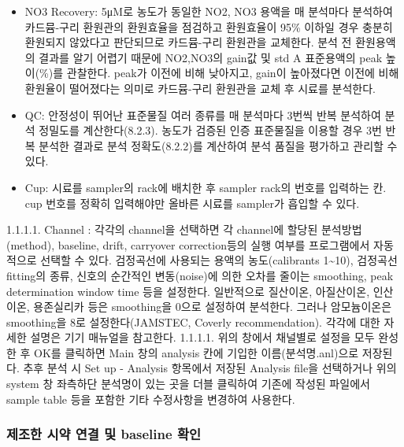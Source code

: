 \documentclass[
]{book}
\begin{document}
\begin{itemize}
\item
  NO3 Recovery: 5μM로 농도가 동일한 NO2, NO3 용액을 매 분석마다 분석하여 카드뮴-구리 환원관의 환원효율을 점검하고 환원효율이 95\% 이하일 경우 충분히 환원되지 않았다고 판단되므로 카드뮴-구리 환원관을 교체한다.
  분석 전 환원용액의 결과를 알기 어렵기 때문에 NO2,NO3의 gain값 및 std A 표준용액의 peak 높이(\%)를 관찰한다. peak가 이전에 비해 낮아지고, gain이 높아졌다면 이전에 비해 환원율이 떨어졌다는 의미로 카드뮴-구리 환원관을 교체 후 시료를 분석한다.
\item
  QC: 안정성이 뛰어난 표준물질 여러 종류를 매 분석마다 3번씩 반복 분석하여 분석 정밀도를 계산한다(8.2.3). 농도가 검증된 인증 표준물질을 이용할 경우 3번 반복 분석한 결과로 분석 정확도(8.2.2)를 계산하여 분석 품질을 평가하고 관리할 수 있다.
\item
  Cup: 시료를 sampler의 rack에 배치한 후 sampler rack의 번호를 입력하는 칸. cup 번호를 정확히 입력해야만 올바른 시료를 sampler가 흡입할 수 있다.
\end{itemize}

1.1.1.1. Channel : 각각의 channel을 선택하면 각 channel에 할당된 분석방법 (method), baseline, drift, carryover correction등의 실행 여부를 프로그램에서 자동적으로 선택할 수 있다. 검정곡선에 사용되는 용액의 농도(calibrants 1\textasciitilde10), 검정곡선 fitting의 종류, 신호의 순간적인 변동(noise)에 의한 오차를 줄이는 smoothing, peak determination window time 등을 설정한다. 일반적으로 질산이온, 아질산이온, 인산이온, 용존실리카 등은 smoothing을 0으로 설정하여 분석한다. 그러나 암모늄이온은 smoothing을 8로 설정한다(JAMSTEC, Coverly recommendation). 각각에 대한 자세한 설명은 기기 매뉴얼을 참고한다.
1.1.1.1. 위의 창에서 채널별로 설정을 모두 완성한 후 OK를 클릭하면 Main 창의 analysis 칸에 기입한 이름(분석명.anl)으로 저장된다. 추후 분석 시 Set up - Analysis 항목에서 저장된 Analysis file을 선택하거나 위의 system 창 좌측하단 분석명이 있는 곳을 더블 클릭하여 기존에 작성된 파일에서 sample table 등을 포함한 기타 수정사항을 변경하여 사용한다.

\hypertarget{uxc81cuxc870uxd55c-uxc2dcuxc57d-uxc5f0uxacb0-uxbc0f-baseline-uxd655uxc778}{%
\subsubsection{제조한 시약 연결 및 baseline 확인}\label{uxc81cuxc870uxd55c-uxc2dcuxc57d-uxc5f0uxacb0-uxbc0f-baseline-uxd655uxc778}}
\end{document}
